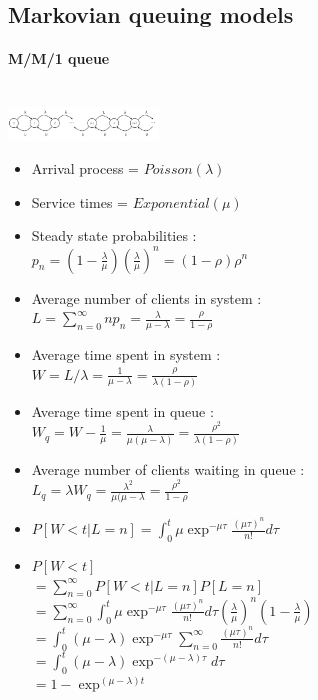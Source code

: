 \documentclass[paper=a4,fontsize=8pt,pagesize,DIV=calc]{scrartcl}
\begin{document}
\begin{multicols}{3}
\section{Markovian queuing models}
\paragraph{M/M/1 queue}~~\\
\includegraphics[width=0.3\textwidth]{MM1}
\begin{itemize}
\item Arrival process = $Poisson(\lambda)$
\item Service times = $Exponential(\mu)$
\item Steady state probabilities : 
\\$p_n=(1-\frac{\lambda}{\mu})\left(\frac{\lambda}{\mu}\right)^n=(1-\rho)\rho^n$
\item Average number of clients in system : 
\\$L=\sum_{n=0}^{\infty} np_n=\frac{\lambda}{\mu-\lambda}=\frac{\rho}{1-\rho}$
\item Average time spent in system :
\\$W=L/\lambda=\frac{1}{\mu-\lambda}=\frac{\rho}{\lambda(1-\rho)}$
\item Average time spent in queue :
\\ $W_q=W-\frac{1}{\mu}=\frac{\lambda}{\mu(\mu-\lambda)}=\frac{\rho^2}{\lambda(1-\rho)}$
\item Average number of clients waiting in queue :
\\ $L_q=\lambda W_q=\frac{\lambda^2}{\mu (\mu-\lambda}=\frac{\rho^2}{1-\rho}$
\item $P[W<t|L=n]=\int_0^t \mu \exp^{-\mu \tau}\frac{(\mu\tau)^n}{n!}d\tau$
\item $P[W <t]$
\\$ =\sum_{n=0}^{\infty} P[W <t|L = n]P[L = n]$
\\$=\sum_{n=0}^{\infty} \int_0^t \mu \exp^{-\mu \tau}\frac{(\mu \tau)^n}{n!}d\tau \left( \frac{\lambda}{\mu}\right)^n \left(1-\frac{\lambda}{\mu}\right)$
\\$=\int_0^t (\mu -\lambda) \exp^{-\mu \tau}\sum_{n=0}^{\infty} \frac{(\mu \tau)^n}{n!}d\tau $
\\$=\int_0^t (\mu -\lambda) \exp^{-(\mu-\lambda) \tau}d\tau $
\\$=1-\exp^{(\mu-\lambda)t}$
\end{itemize}


\end{multicols}
\end{document}
